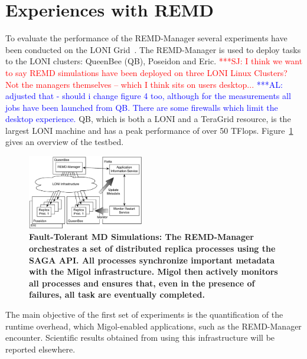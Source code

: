 \documentclass{rspublic}
\newcommand{\up}{}%
\newcommand{\alnote}[1]{ {\textcolor{blue} { ***AL: #1 }}}
\newcommand{\jhanote}[1]{ {\textcolor{red} { ***SJ: #1 }}}
\newcommand{\alnote}[1]{}
\newcommand{\jhanote}[1]{}
\begin{document}
\section{Experiences with REMD}
\label{sec:exp}       
        
\up To evaluate the performance of the REMD-Manager several
experiments have been conducted on the LONI
Grid~\cite{loni}. The REMD-Manager is used to deploy tasks to
the LONI clusters: QueenBee (QB), Poseidon and Eric.  \jhanote{I think
  we want to say REMD simulations have been deployed on three LONI
  Linux Clusters? Not the managers themselves -- which I think sits on
  users desktop...}  \alnote{adjusted that - should i change figure 4
  too, although for the measurements all jobs have been launched from
  QB. There are some firewalls which limit the desktop experience.}
QB, which is both a LONI and a TeraGrid resource, is the largest LONI
machine and has a peak performance of over 50 TFlops.
Figure~\ref{fig:saga-taskfarming} gives an overview of the testbed.

\begin{figure}[t]
    \centering
        \includegraphics[width=0.45\textwidth]{saga-taskfarming}
        \caption{\footnotesize \bf Fault-Tolerant MD Simulations: The
          REMD-Manager orchestrates a set of distributed replica
          processes using the SAGA API. All processes synchronize
          important metadata with the Migol infrastructure. Migol then
          actively monitors all processes and ensures that, even in
          the presence of failures, all task are eventually
          completed.\up}
    \label{fig:saga-taskfarming}
\end{figure} 
The main objective of the first set of experiments is the
quantification of the runtime overhead, which Migol-enabled
applications, such as the REMD-Manager encounter.  Scientific results
obtained from using this infrastructure will be reported elsewhere.
\end{document}
